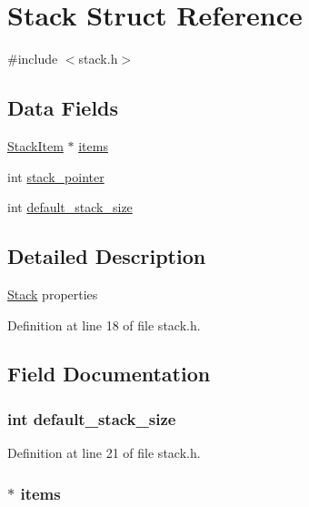 \hypertarget{struct_stack}{\section{Stack Struct Reference}
\label{struct_stack}
}


{\ttfamily \#include $<$stack.\+h$>$}

\subsection*{Data Fields}
\begin{DoxyCompactItemize}
\item 
\hyperlink{stack_8h_a2fe7ea9a2959daba7ada826ed5d4a81a}{Stack\+Item} $\ast$ \hyperlink{struct_stack_a5e5b676746ec4576a9b6d77466582bc0}{items}
\item 
int \hyperlink{struct_stack_aeaf89f98603ac91bfe0c34b6e11e8fc5}{stack\+\_\+pointer}
\item 
int \hyperlink{struct_stack_aead5c5991ae038e467726c5a146d6103}{default\+\_\+stack\+\_\+size}
\end{DoxyCompactItemize}


\subsection{Detailed Description}
\hyperlink{struct_stack}{Stack} properties 

Definition at line 18 of file stack.\+h.



\subsection{Field Documentation}
\hypertarget{struct_stack_aead5c5991ae038e467726c5a146d6103}{
\subsubsection[{default\+\_\+stack\+\_\+size}]{\setlength{\rightskip}{0pt plus 5cm}int default\+\_\+stack\+\_\+size}}\label{struct_stack_aead5c5991ae038e467726c5a146d6103}


Definition at line 21 of file stack.\+h.

\hypertarget{struct_stack_a5e5b676746ec4576a9b6d77466582bc0}{
\subsubsection[{items}]{$\ast$ items}}\label{struct_stack_a5e5b676746ec4576a9b6d77466582bc0}


